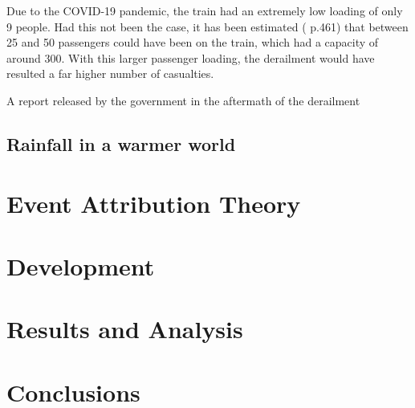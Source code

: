 \documentclass[12pt,a4paper,oneside]{report}
\begin{document}
Due to the COVID-19 pandemic,
    the train had an extremely low loading of only 9 people.
Had this not been the case,
    it has been estimated (\cite{RAIB_2022} p.461) that between 25 and 50 passengers could have been on the train,
    which had a capacity of around 300.
With this larger passenger loading,
    the derailment would have resulted a far higher number of casualties.

A report released by the government in the aftermath of the derailment~\cite{}


\section{Rainfall in a warmer world}\label{sec:warmerrainfall}

\chapter{Event Attribution Theory}\label{ch:attribution}


\chapter{Development}\label{ch:dev}


\chapter{Results and Analysis}\label{ch:results}


\chapter{Conclusions}\label{ch:conclusions}
\end{document}
